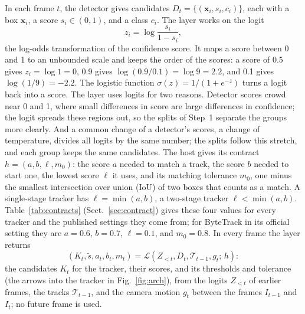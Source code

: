 \documentclass[pdflatex,sn-mathphys-num,iicol]{sn-jnl}
\makeatletter
\renewcommand\subsection{\@startsection{subsection}{2}{\z@}{-9pt \@plus -3pt \@minus -2pt}{4pt}{\subsectionfont}}
\makeatother
\begin{document}
\subsection{Inputs and outputs of SCL}\label{sec:problem}
In each frame $t$, the detector gives candidates $D_t=\{(\mathbf{x}_i,s_i,c_i)\}$, each with a box
$\mathbf{x}_i$, a score $s_i\in(0,1)$, and a class $c_i$. The layer works on the logit
\begin{equation}
z_i=\log\frac{s_i}{1-s_i},
\label{eq:logit}
\end{equation}
the log-odds transformation of the confidence score. It maps a score between 0 and 1 to an
unbounded scale and keeps the order of the scores: a score of 0.5 gives $z_i=\log1=0$, 0.9 gives
$\log(0.9/0.1)=\log9=2.2$, and 0.1 gives $\log(1/9)=-2.2$. The logistic function $\sigma(z)=1/(1+e^{-z})$ turns a logit back into a
score. The layer uses logits for two reasons. Detector scores crowd near 0 and 1, where small
differences in score are large differences in confidence; the logit spreads these regions out, so
the splits of Step~1 separate the groups more clearly. And a common change of a detector's scores,
a change of temperature, divides all logits by the same number; the splits follow this stretch,
and each group keeps the same candidates. The host gives its contract $h=(a,b,\ell,m_0)$: the score $a$ needed to match a track, the
score $b$ needed to start one, the lowest score $\ell$ it uses, and its matching tolerance $m_0$,
one minus the smallest intersection over union (IoU) of two boxes that counts as a match. A
single-stage tracker has $\ell=\min(a,b)$, a two-stage tracker $\ell<\min(a,b)$. Table~\ref{tab:contracts}
(Sect.~\ref{sec:contract}) gives these four values for every tracker and the published settings they
come from; for ByteTrack in its official setting they are $a=0.6$, $b=0.7$, $\ell=0.1$, and
$m_0=0.8$. In every frame
the layer returns
\begin{equation}
\left(K_t,\tilde{s},a_t,b_t,m_t\right)=
\mathcal{L}\left(Z_{<t},D_t,\mathcal{T}_{t-1},g_t;\,h\right):
\label{eq:layer}
\end{equation}
the candidates $K_t$ for the tracker, their scores, and its thresholds and tolerance (the arrows
into the tracker in Fig.~\ref{fig:arch}), from the logits $Z_{<t}$ of earlier frames, the tracks
$\mathcal{T}_{t-1}$, and the camera motion $g_t$ between the frames $I_{t-1}$ and $I_t$; no future
frame is used.
\end{document}

